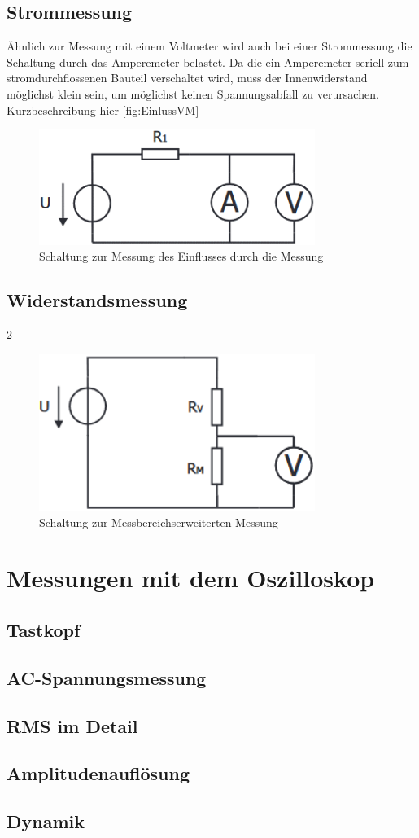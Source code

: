 \documentclass[a4paper]{article}
\begin{document}
\subsection{Strommessung}
Ähnlich zur Messung mit einem Voltmeter wird auch bei einer Strommessung die
Schaltung durch das Amperemeter belastet. Da die ein Amperemeter seriell zum
stromdurchflossenen Bauteil verschaltet wird, muss der Innenwiderstand möglichst
klein sein, um möglichst keinen Spannungsabfall zu verursachen.
Kurzbeschreibung hier \ref{fig:EinlussVM}
\begin{figure}[h]
	\centering
	\includegraphics[width=0.8\textwidth]{schematics/2a_RiAM.png}
	\caption{Schaltung zur Messung des Einflusses durch die Messung}
	\label{fig:WUT}
\end{figure}

\subsection{Widerstandsmessung}
\ref{fig:MB-Erweiterung}
\begin{figure}[h]
	\centering
	\includegraphics[width=0.8\textwidth]{schematics/1c_MessbereichserweiterungVM.png}
	\caption{Schaltung zur Messbereichserweiterten Messung}
	\label{fig:MB-Erweiterung}
\end{figure}

\section{Messungen mit dem Oszilloskop}
\subsection{Tastkopf}
\subsection{AC-Spannungsmessung}
\subsection{RMS im Detail}
\subsection{Amplitudenauflösung}
\subsection{Dynamik}
\end{document}
